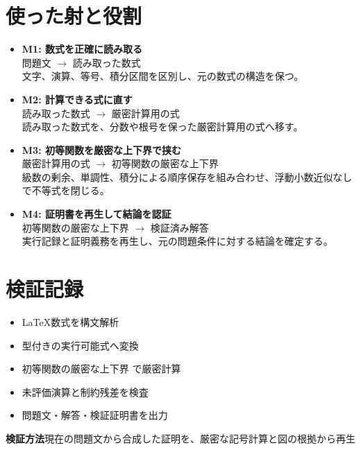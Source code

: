 \documentclass[uplatex,dvipdfmx,11pt]{jsarticle}
\begin{document}
\clearpage
\section*{使った射と役割}
\begin{itemize}
\item \textbf{M1: 数式を正確に読み取る}\\
問題文
$\longrightarrow$
読み取った数式\\
文字、演算、等号、積分区間を区別し、元の数式の構造を保つ。
\item \textbf{M2: 計算できる式に直す}\\
読み取った数式
$\longrightarrow$
厳密計算用の式\\
読み取った数式を、分数や根号を保った厳密計算用の式へ移す。
\item \textbf{M3: 初等関数を厳密な上下界で挟む}\\
厳密計算用の式
$\longrightarrow$
初等関数の厳密な上下界\\
級数の剰余、単調性、積分による順序保存を組み合わせ、浮動小数近似なしで不等式を閉じる。
\item \textbf{M4: 証明書を再生して結論を認証}\\
初等関数の厳密な上下界
$\longrightarrow$
検証済み解答\\
実行記録と証明義務を再生し、元の問題条件に対する結論を確定する。
\end{itemize}




\section*{検証記録}
\begin{itemize}
\item LaTeX数式を構文解析
\item 型付きの実行可能式へ変換
\item 初等関数の厳密な上下界 で厳密計算
\item 未評価演算と制約残差を検査
\item 問題文・解答・検証証明書を出力
\end{itemize}
\noindent\textbf{検証方法}\quad 現在の問題文から合成した証明を、厳密な記号計算と図の根拠から再生
\par{}
\end{document}
